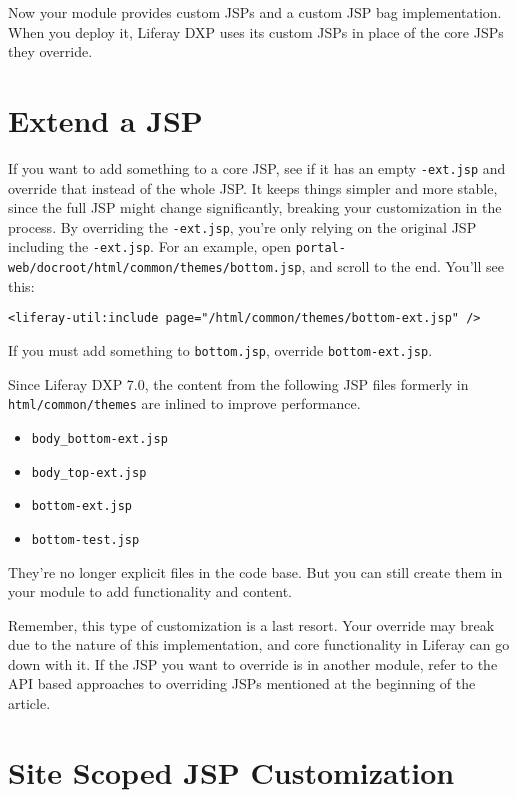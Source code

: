 Now your module provides custom JSPs and a custom JSP bag
implementation. When you deploy it, Liferay DXP uses its custom JSPs in
place of the core JSPs they override.

\section{Extend a JSP}\label{extend-a-jsp}

If you want to add something to a core JSP, see if it has an empty
\texttt{-ext.jsp} and override that instead of the whole JSP. It keeps
things simpler and more stable, since the full JSP might change
significantly, breaking your customization in the process. By overriding
the \texttt{-ext.jsp}, you're only relying on the original JSP including
the \texttt{-ext.jsp}. For an example, open
\texttt{portal-web/docroot/html/common/themes/bottom.jsp}, and scroll to
the end. You'll see this:

\begin{verbatim}
<liferay-util:include page="/html/common/themes/bottom-ext.jsp" />
\end{verbatim}

If you must add something to \texttt{bottom.jsp}, override
\texttt{bottom-ext.jsp}.

Since Liferay DXP 7.0, the content from the following JSP files formerly
in \texttt{html/common/themes} are inlined to improve performance.

\begin{itemize}
\tightlist
\item
  \texttt{body\_bottom-ext.jsp}
\item
  \texttt{body\_top-ext.jsp}
\item
  \texttt{bottom-ext.jsp}
\item
  \texttt{bottom-test.jsp}
\end{itemize}

They're no longer explicit files in the code base. But you can still
create them in your module to add functionality and content.

Remember, this type of customization is a last resort. Your override may
break due to the nature of this implementation, and core functionality
in Liferay can go down with it. If the JSP you want to override is in
another module, refer to the API based approaches to overriding JSPs
mentioned at the beginning of the article.

\section{Site Scoped JSP
Customization}\label{site-scoped-jsp-customization}

